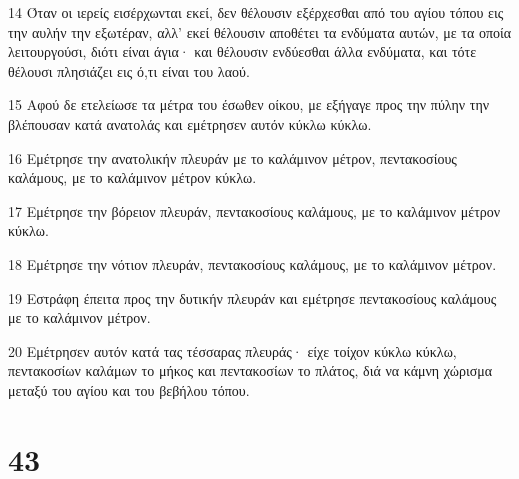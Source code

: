 \par 14 Όταν οι ιερείς εισέρχωνται εκεί, δεν θέλουσιν εξέρχεσθαι από του αγίου τόπου εις την αυλήν την εξωτέραν, αλλ' εκεί θέλουσιν αποθέτει τα ενδύματα αυτών, με τα οποία λειτουργούσι, διότι είναι άγια· και θέλουσιν ενδύεσθαι άλλα ενδύματα, και τότε θέλουσι πλησιάζει εις ό,τι είναι του λαού.
\par 15 Αφού δε ετελείωσε τα μέτρα του έσωθεν οίκου, με εξήγαγε προς την πύλην την βλέπουσαν κατά ανατολάς και εμέτρησεν αυτόν κύκλω κύκλω.
\par 16 Εμέτρησε την ανατολικήν πλευράν με το καλάμινον μέτρον, πεντακοσίους καλάμους, με το καλάμινον μέτρον κύκλω.
\par 17 Εμέτρησε την βόρειον πλευράν, πεντακοσίους καλάμους, με το καλάμινον μέτρον κύκλω.
\par 18 Εμέτρησε την νότιον πλευράν, πεντακοσίους καλάμους, με το καλάμινον μέτρον.
\par 19 Εστράφη έπειτα προς την δυτικήν πλευράν και εμέτρησε πεντακοσίους καλάμους με το καλάμινον μέτρον.
\par 20 Εμέτρησεν αυτόν κατά τας τέσσαρας πλευράς· είχε τοίχον κύκλω κύκλω, πεντακοσίων καλάμων το μήκος και πεντακοσίων το πλάτος, διά να κάμνη χώρισμα μεταξύ του αγίου και του βεβήλου τόπου.

\chapter{43}

